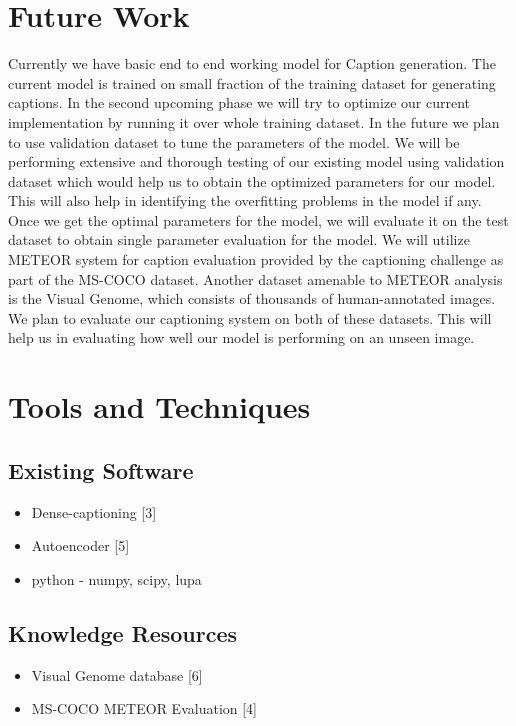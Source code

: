 \documentclass[11pt]{article}
\begin{document}
\section{Future Work}
Currently we have basic end to end working model for Caption generation. The current model is trained on small fraction of the training dataset for generating captions. In the second upcoming phase we will try to optimize our current implementation by running it over whole training dataset. In the future we plan to use validation dataset to tune the parameters of the model. We will be performing extensive and thorough testing of our existing model using validation dataset which would help us to obtain the optimized parameters for our model. This will also help in identifying the overfitting problems in the model if any. Once we get the optimal parameters for the model, we will evaluate it on the test dataset to obtain single parameter evaluation for the model.  We will utilize METEOR system for caption evaluation provided by the captioning challenge as part of the MS-COCO dataset. Another dataset amenable to METEOR analysis is the Visual Genome, which consists of thousands of human-annotated images. We plan to evaluate our captioning system on both of these datasets. This will help us in evaluating how well our model is performing on an unseen image.

\section{Tools and Techniques}
\subsection{Existing Software}
\begin{itemize}
\item Dense-captioning [3]
\item Autoencoder [5]
\item python - numpy, scipy, lupa
\end{itemize}
\subsection{Knowledge Resources}
\begin{itemize}
\item Visual Genome database [6]
\item MS-COCO METEOR Evaluation [4]
\end{itemize}


%
%
\end{document}
